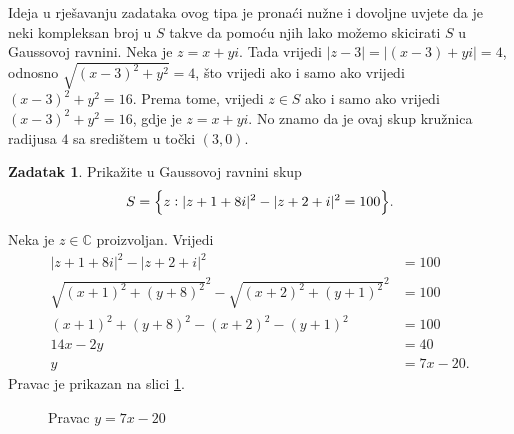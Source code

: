 \documentclass{book}
\let\originalleft\left
\let\originalright\right
\renewcommand{\left}{\mathopen{}\mathclose\bgroup\originalleft}
\renewcommand{\right}{\aftergroup\egroup\originalright}
\renewenvironment{proof}{%
    \vspace{-\parskip}\begin{oldproof}%
    }{%
    \end{oldproof}%
}
\theoremstyle{definition}
\theoremstyle{definition}
\newtheorem{exercise}{Zadatak}
\theoremstyle{remark}
\begin{document}
\begin{proof}[Rješenje]
Ideja u rješavanju zadataka ovog tipa je pronaći nužne i dovoljne uvjete da je neki kompleksan broj u $S$ takve da pomoću njih lako možemo skicirati $S$ u Gaussovoj ravnini. Neka je $z=x+yi$. Tada vrijedi $|z-3|=|(x-3)+yi|=4$, odnosno $\sqrt{(x-3)^2+y^2}=4$, što vrijedi ako i samo ako vrijedi $(x-3)^2+y^2=16$. Prema tome, vrijedi $z\in S$ ako i samo ako vrijedi $(x-3)^2+y^2=16$, gdje je $z=x+yi$. No znamo da je ovaj skup kružnica radijusa $4$ sa središtem u točki $(3, 0)$.
\begin{figure}[ht]
\begin{center}
\end{center}
\end{figure}
\end{proof}
\begin{exercise}
Prikažite u Gaussovoj ravnini skup 
$$S=\left\{z : |z+1+8i|^2-|z+2+i|^2=100\right\}.$$
\end{exercise}
\begin{proof}[Rješenje]
Neka je $z\in \mathbb{C}$ proizvoljan. Vrijedi
\begin{align*}
|z+1+8i|^2-|z+2+i|^2&=100\\
\sqrt{(x+1)^2+(y+8)^2}^2-\sqrt{(x+2)^2+(y+1)^2}^2&=100\\
(x+1)^2+(y+8)^2-(x+2)^2-(y+1)^2&=100\\
14x-2y&=40\\
y&=7x-20.
\end{align*}
Pravac je prikazan na slici \ref{pravac}.
\begin{figure}[ht]
\begin{center}
\end{center}
\caption{Pravac $y=7x-20$}
\label{pravac}
\end{figure}
\end{proof}
\end{document}

